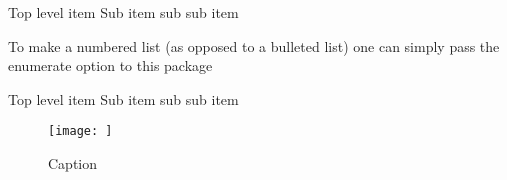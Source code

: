 \documentclass{article}
\begin{document}
\begin{outline}
 \1 Top level item
   \2 Sub item
     \3 sub sub item
\end{outline}


To make a numbered list (as opposed to a bulleted list) one can simply pass the enumerate option to this package

\begin{outline}[enumerate]
 \1 Top level item
   \2 Sub item
     \3 sub sub item
\end{outline}




\begin{figure}[htbp]
    \centering
    \texttt{[image: ]}
    \caption{Caption}
    \label{fig:my_label}
\end{figure}
\end{document}
